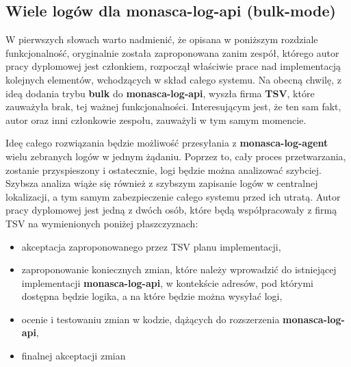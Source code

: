 \subsection{Wiele logów dla monasca-log-api (bulk-mode)}
\label{chapter:application:plans:bulk_monasca_log_api}

W pierwszych słowach warto nadmienić, że opisana w poniższym rozdziale funkcjonalność, oryginalnie została 
zaproponowana zanim zespół, którego autor pracy dyplomowej jest członkiem, rozpoczął właściwie prace
nad implementacją kolejnych elementów, wchodzących w skład całego systemu. Na obecną chwilę, z ideą 
dodania trybu \textbf{bulk} do \textbf{monasca-log-api}, wyszła firma \textbf{TSV}, które zauważyła brak, tej
ważnej funkcjonalności. Interesującym jest, że ten sam fakt, autor oraz inni członkowie zespołu, zauważyli
w tym samym momencie. 

Ideę całego rozwiązania będzie możliwość przesyłania z \textbf{monasca-log-agent} wielu zebranych logów
w jednym żądaniu. Poprzez to, cały proces przetwarzania, zostanie przyspieszony i ostatecznie, logi
będzie można analizować szybciej. Szybsza analiza wiąże się również z szybszym zapisanie logów w centralnej lokalizacji,
a tym samym zabezpieczenie całego systemu przed ich utratą. Autor pracy dyplomowej jest jedną z dwóch osób, które będą
współpracowały z firmą TSV na wymienionych poniżej płaszczyznach:
\begin{itemize}
    \item akceptacja zaproponowanego przez TSV planu implementacji,
    \item zaproponowanie koniecznych zmian, które należy wprowadzić do istniejącej implementacji \textbf{monasca-log-api},
    w kontekście adresów, pod którymi dostępna będzie logika, a na które będzie można wysyłać logi,
    \item ocenie i testowaniu zmian w kodzie, dążących do rozszerzenia \textbf{monasca-log-api},
    \item finalnej akceptacji zmian
\end{itemize}